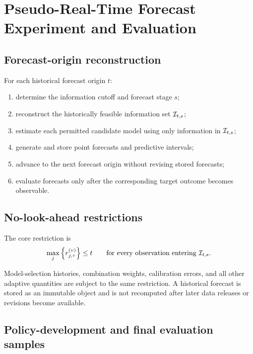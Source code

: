 \section{Pseudo-Real-Time Forecast Experiment and Evaluation}
\label{sec:experiment}

\subsection{Forecast-origin reconstruction}
\label{subsec:forecast_origin}

For each historical forecast origin $t$:
\begin{enumerate}[leftmargin=*]
    \item determine the information cutoff and forecast stage $s$;
    \item reconstruct the historically feasible information set $\mathcal{I}_{t,s}$;
    \item estimate each permitted candidate model using only information in $\mathcal{I}_{t,s}$;
    \item generate and store point forecasts and predictive intervals;
    \item advance to the next forecast origin without revising stored forecasts;
    \item evaluate forecasts only after the corresponding target outcome becomes observable.
\end{enumerate}

\subsection{No-look-ahead restrictions}
\label{subsec:no_lookahead}

The core restriction is
\begin{equation}
    \max_j\left\{r_{j,\tau}^{(v)}\right\}
    \leq t
    \qquad
    \text{for every observation entering }\mathcal{I}_{t,s}.
    \label{eq:no_lookahead}
\end{equation}

Model-selection histories, combination weights, calibration errors, and all other adaptive quantities are subject to the same restriction. A historical forecast is stored as an immutable object and is not recomputed after later data releases or revisions become available.

\subsection{Policy-development and final evaluation samples}
\label{subsec:development_evaluation}

